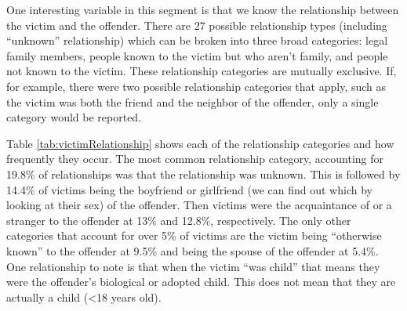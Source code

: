 \documentclass[
]{krantz}
\begin{document}
One interesting variable in this segment is that we know the
relationship between the victim and the offender. There are
27 possible relationship types (including ``unknown''
relationship) which can be broken into three broad
categories: legal family members, people known to the victim
but who aren't family, and people not known to the victim.
These relationship categories are mutually exclusive. If,
for example, there were two possible relationship categories
that apply, such as the victim was both the friend and the
neighbor of the offender, only a single category would be
reported.

Table \ref{tab:victimRelationship} shows each of the
relationship categories and how frequently they occur. The
most common relationship category, accounting for 19.8\% of
relationships was that the relationship was unknown. This is
followed by 14.4\% of victims being the boyfriend or
girlfriend (we can find out which by looking at their sex)
of the offender. Then victims were the acquaintance of or a
stranger to the offender at 13\% and 12.8\%, respectively.
The only other categories that account for over 5\% of
victims are the victim being ``otherwise known'' to the
offender at 9.5\% and being the spouse of the offender at
5.4\%. One relationship to note is that when the victim
``was child'' that means they were the offender's biological
or adopted child. This does not mean that they are actually
a child (\textless18 years old).
\end{document}
